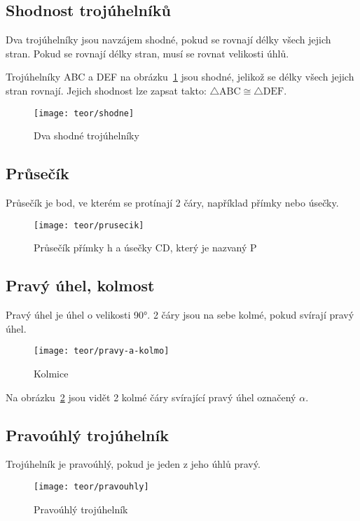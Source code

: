 \subsection{Shodnost trojúhelníků}
Dva trojúhelníky jsou navzájem shodné, pokud se rovnají délky všech jejich stran. Pokud se rovnají délky stran, musí se rovnat velikosti úhlů.

Trojúhelníky ABC a DEF na obrázku~\ref{fig:shodne} jsou shodné, jelikož se délky všech jejich stran rovnají. Jejich shodnost lze zapsat takto: $\triangle\text{ABC} \cong \triangle\text{DEF}$.

\begin{figure}[h]
	\centering
	\texttt{[image: teor/shodne]}
	\caption{Dva shodné trojúhelníky}
	\label{fig:shodne}
\end{figure}

\subsection{Průsečík}
Průsečík je bod, ve kterém se protínají 2 čáry, například přímky nebo úsečky.

\begin{figure}[h]
    \centering
    \texttt{[image: teor/prusecik]}
    \caption{Průsečík přímky h a úsečky CD, který je nazvaný P}
\end{figure}

\subsection{Pravý úhel, kolmost}
Pravý úhel je úhel o velikosti 90°. 2 čáry jsou na sebe kolmé, pokud svírají pravý úhel.

\begin{figure}[h]
    \centering
    \texttt{[image: teor/pravy-a-kolmo]}
    \caption{Kolmice}
    \label{fig:kolm}
\end{figure}

Na obrázku~\ref{fig:kolm} jsou vidět 2 kolmé čáry svírající pravý úhel označený $\alpha$.

\subsection{Pravoúhlý trojúhelník}
Trojúhelník je pravoúhlý, pokud je jeden z jeho úhlů pravý.

\begin{figure}[!h]
    \centering
    \texttt{[image: teor/pravouhly]}
    \caption{Pravoúhlý trojúhelník}
    \label{fig:pravouhly_troj}
\end{figure}

